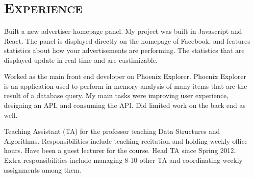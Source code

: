\begin{resume}
\begin{formatb}
  \\
  \\
  \body\\
\end{formatb}

\section{\textsc{Experience}}

\begin{position}
Built a new advertiser homepage panel. My project was built in Javascript and React. The panel is displayed directly on the homepage of Facebook, and features statistics about how your advertisements are performing. The statistics that are displayed update in real time and are custimizable.
\end{position}

\begin{position}
Worked as the main front end developer on Phoenix Explorer. Phoenix Explorer is an application used to perform in memory analysis of many items that are the result of a database query. My main tasks were improving user experience, designing an API, and consuming the API. Did limited work on the back end as well.
\end{position}

\begin{position}
Teaching Assistant (TA) for the professor teaching Data Structures and Algorithms. Responsibilities include teaching recitation and holding weekly office hours. Have been a guest lecturer for the course. Head TA since Spring 2012. Extra responsibilities include managing 8-10 other TA and coordinating weekly assignments among them.
\end{position}



\end{resume}
